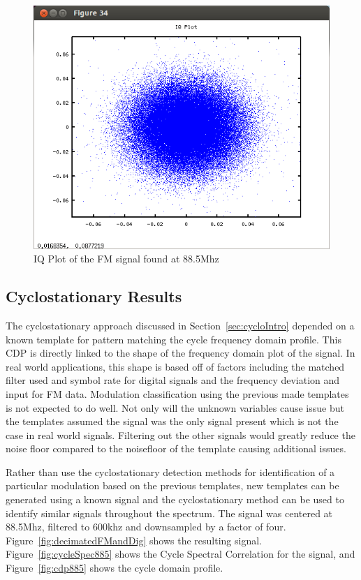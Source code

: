 \begin{figure}
\centering
\includegraphics[width=\linewidth]{../img/Report_IQ_Plot_Digital.png}
\caption{IQ Plot of the FM signal found at 88.5Mhz}
\label{fig:FMIQ}
\end{figure}

\subsection{Cyclostationary Results}

The cyclostationary approach discussed in Section~\ref{sec:cycloIntro} depended
on a known template for pattern matching the cycle frequency domain profile. 
This CDP is directly linked to the shape of the frequency domain plot of the
signal.  In real world applications, this shape is based off of factors
including the matched filter used and symbol rate for digital signals and the
frequency deviation and input for FM data.
Modulation classification using the previous made templates is not expected to
do well.  Not only will the unknown variables cause issue but the templates
assumed the signal was the only signal present which is not the case in real
world signals.  Filtering out the other signals would greatly reduce the noise
floor compared to the noisefloor of the template causing additional issues.

Rather than use the cyclostationary detection methods for identification of a
particular modulation based on the previous templates, new templates can be
generated using a known signal and the cyclostationary method can be used to
identify similar signals throughout the spectrum.  The signal was centered at
88.5Mhz, filtered to 600khz and downsampled by a factor of four.
Figure~\ref{fig:decimatedFMandDig} shows the resulting signal. 
Figure~\ref{fig:cycleSpec885} shows the Cycle Spectral Correlation for the
signal, and Figure~\ref{fig:cdp885} shows the cycle domain profile.

